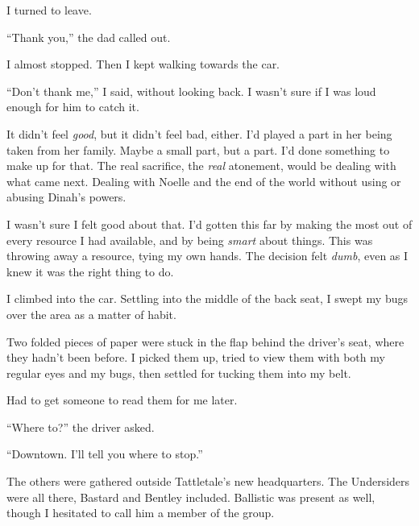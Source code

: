 I turned to leave.



``Thank you,'' the dad called out.



I almost stopped.  Then I kept walking towards the car.



``Don't thank me,'' I said, without looking back.  I wasn't sure if I was loud enough for him to catch it.



It didn't feel \emph{good}, but it didn't feel bad, either.  I'd played a part in her being taken from her family.  Maybe a small part, but a part.  I'd done something to make up for that.  The real sacrifice, the \emph{real} atonement, would be dealing with what came next.  Dealing with Noelle and the end of the world without using or abusing Dinah's powers.



I wasn't sure I felt good about that.  I'd gotten this far by making the most out of every resource I had available, and by being \emph{smart} about things.  This was throwing away a resource, tying my own hands.  The decision felt \emph{dumb}, even as I knew it was the right thing to do.



I climbed into the car.  Settling into the middle of the back seat, I swept my bugs over the area as a matter of habit.



Two folded pieces of paper were stuck in the flap behind the driver's seat, where they hadn't been before.  I picked them up, tried to view them with both my regular eyes and my bugs, then settled for tucking them into my belt.



Had to get someone to read them for me later.



``Where to?'' the driver asked.



``Downtown.  I'll tell you where to stop.''



\sectionbreak



The others were gathered outside Tattletale's new headquarters.  The Undersiders were all there, Bastard and Bentley included.  Ballistic was present as well, though I hesitated to call him a member of the group.



